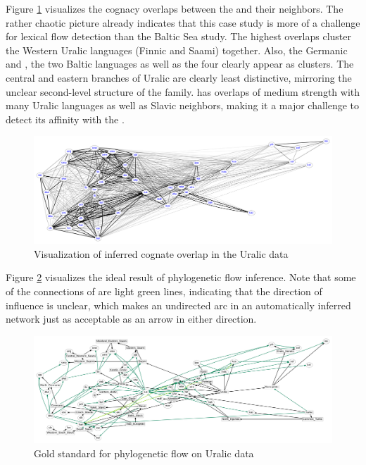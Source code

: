 Figure \ref{uralic-cognacy} visualizes the cognacy overlaps between the  and their neighbors. The rather chaotic picture already indicates that this case study is more of a challenge for lexical flow detection than the Baltic Sea study. The highest overlaps cluster the Western Uralic languages (Finnic and Saami) together. Also, the Germanic and , the two Baltic languages as well as the four  clearly appear as clusters. The central and eastern branches of Uralic are clearly least distinctive, mirroring the unclear second-level structure of the family.  has overlaps of medium strength with many Uralic languages as well as Slavic neighbors, making it a major challenge to detect its affinity with the .

\begin{figure}
 \includegraphics[width=\textwidth]{figures/cognacy-strength-uralic.pdf}
 \caption{Visualization of inferred cognate overlap in the Uralic data}
 \label{uralic-cognacy}
\end{figure}

Figure \ref{uralic-goldstandard-phylo} visualizes the ideal result of phylogenetic flow inference. Note that some of the connections of  are light green lines, indicating that the direction of influence is unclear, which makes an undirected arc in an automatically inferred network just as acceptable as an arrow in either direction.

\begin{figure}
 \includegraphics[width=\textwidth]{figures/goldstandard-phylo-uralic.pdf}
 \caption{Gold standard for phylogenetic flow on Uralic data}
 \label{uralic-goldstandard-phylo}
\end{figure}

